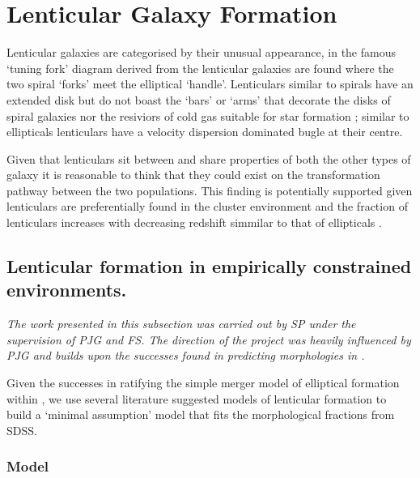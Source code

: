 \section{Lenticular Galaxy Formation}
Lenticular galaxies are categorised by their unusual appearance, in the famous `tuning fork' diagram derived from \citet{Hubble1927TheNebulae} the lenticular galaxies are found where the two spiral `forks' meet the elliptical `handle'. Lenticulars similar to spirals have an extended disk but do not boast the `bars' or `arms' that decorate the disks of spiral galaxies nor the resiviors of cold gas suitable for star formation \cite{CHAMARAUX1986TheSamples}; similar to ellipticals lenticulars have a velocity dispersion dominated bugle at their centre. 

Given that lenticulars sit between and share properties of both the other types of galaxy it is reasonable to think that they could exist on the transformation pathway between the two populations. This finding is potentially supported given lenticulars are preferentially found in the cluster environment \cite{Dressler1980GalaxyGalaxies} and the fraction of lenticulars increases with decreasing redshift simmilar to that of ellipticals \cite{Postman2005TheClusters}. 

\subsection{Lenticular formation in empirically constrained environments.}
\textit{The work presented in this subsection was carried out by SP under the supervision of PJG and FS. The direction of the project was heavily influenced by PJG and builds upon the successes found in predicting morphologies in \steel.}

Given the successes in ratifying the simple merger model of elliptical formation within \steel, we use several literature suggested models of lenticular formation to build a `minimal assumption' model that fits the morphological fractions from SDSS.

\subsubsection{\citet{Cook2009Two-phaseFormation} Model}

